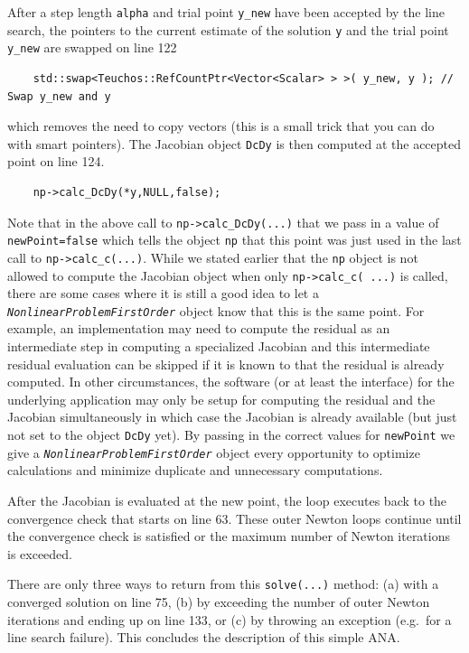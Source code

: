 After a step length \texttt{alpha} and trial point \texttt{y\_new}
have been accepted by the line search, the pointers to the current
estimate of the solution \texttt{y} and the trial point
\texttt{y\_new} are swapped on line 122
%
{\scriptsize\begin{verbatim}
    std::swap<Teuchos::RefCountPtr<Vector<Scalar> > >( y_new, y ); // Swap y_new and y
\end{verbatim}}
%
\noindent{}which removes the need to copy vectors (this is a small trick that you
can do with smart pointers).  The Jacobian object \texttt{DcDy} is
then computed at the accepted point on line 124.
%
{\scriptsize\begin{verbatim}
    np->calc_DcDy(*y,NULL,false);
\end{verbatim}}
%
Note that in the above call to \texttt{np->calc\_DcDy(...)} that we
pass in a value of \texttt{newPoint=false} which tells the object
\texttt{np} that this point was just used in the last call to
\texttt{np->calc\_c(...)}.  While we stated earlier that the
\texttt{np} object is not allowed to compute the Jacobian object
when only \texttt{np->calc\_c( ...)} is called, there are some
cases where it is still a good idea to let a
\texttt{\textit{Nonlinear\-Problem\-First\-Order}} object know
that this is the same point.  For example, an implementation may need
to compute the residual as an intermediate step in computing a
specialized Jacobian and this intermediate residual evaluation can be
skipped if it is known to that the residual is already computed.  In
other circumstances, the software (or at least the interface) for the
underlying application may only be setup for computing the residual
and the Jacobian simultaneously in which case the Jacobian is already
available (but just not set to the object \texttt{DcDy} yet).  By
passing in the correct values for \texttt{newPoint} we give a
\texttt{\textit{Nonlinear\-Problem\-First\-Order}} object every
opportunity to optimize calculations and minimize duplicate and
unnecessary computations.

After the Jacobian is evaluated at the new point, the loop executes
back to the convergence check that starts on line 63.  These outer
Newton loops continue until the convergence check is satisfied or the
maximum number of Newton iterations is exceeded.

There are only three ways to return from this \texttt{solve(...)}
method: (a) with a converged solution on line 75, (b) by exceeding the
number of outer Newton iterations and ending up on line 133, or (c)
by throwing an exception (e.g.~for a line search failure).  This
concludes the description of this simple ANA.

